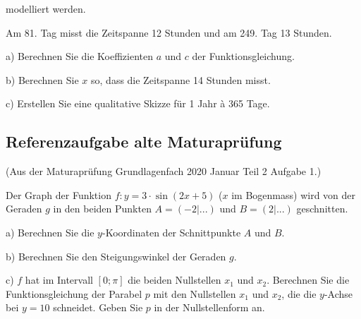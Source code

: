 modelliert werden.

Am 81. Tag misst die Zeitspanne 12 Stunden und am 249. Tag 13 Stunden.

a) Berechnen Sie die Koeffizienten $a$ und $c$ der Funktionsgleichung.

b)  Berechnen Sie $x$ so, dass die Zeitspanne 14 Stunden misst.

c)  Erstellen Sie eine qualitative Skizze für 1 Jahr à 365 Tage.

\newpage

\subsection{Referenzaufgabe alte Maturaprüfung}
(Aus der Maturaprüfung Grundlagenfach 2020 Januar Teil 2 Aufgabe 1.)

Der Graph der Funktion $f: y=3\cdot{}\sin(2x+5)$ ($x$ im Bogenmass)  wird von der Geraden $g$ in den beiden Punkten $A=(-2|...)$ und $B=(2|...)$ geschnitten.

a) Berechnen Sie die $y$-Koordinaten der Schnittpunkte $A$ und $B$.

b) Berechnen Sie den Steigungswinkel der Geraden $g$.


c) $f$ hat im Intervall $[0; \pi]$ die beiden Nullstellen $x_1$ und $x_2$. Berechnen Sie die Funktionsgleichung der Parabel $p$ mit den Nullstellen $x_1$ und $x_2$, die die $y$-Achse bei $y=10$ schneidet. Geben Sie $p$ in der Nullstellenform an.

